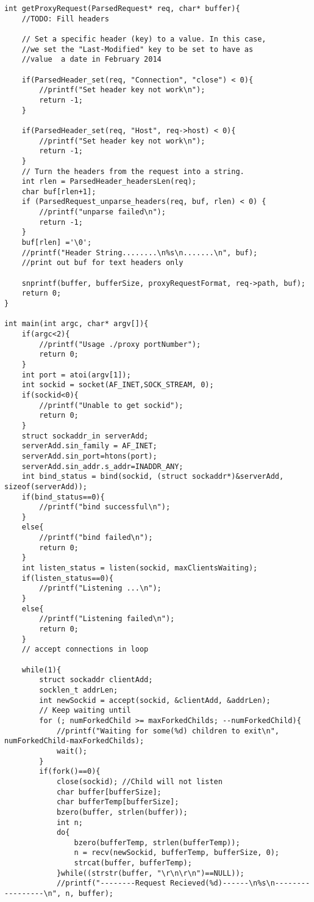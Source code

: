 \documentclass[11pt,a4paper,titlepage]{article}
\begin{document}
\begin{lstlisting}
int getProxyRequest(ParsedRequest* req, char* buffer){
	//TODO: Fill headers
	
	// Set a specific header (key) to a value. In this case,
	//we set the "Last-Modified" key to be set to have as 
	//value  a date in February 2014 

	if(ParsedHeader_set(req, "Connection", "close") < 0){
		//printf("Set header key not work\n");
		return -1;
	}
	
	if(ParsedHeader_set(req, "Host", req->host) < 0){
		//printf("Set header key not work\n");
		return -1;
	}
	// Turn the headers from the request into a string.
	int rlen = ParsedHeader_headersLen(req);
	char buf[rlen+1];
	if (ParsedRequest_unparse_headers(req, buf, rlen) < 0) {
		//printf("unparse failed\n");
		return -1;
	}
	buf[rlen] ='\0';
	//printf("Header String........\n%s\n.......\n", buf);
	//print out buf for text headers only 
	
	snprintf(buffer, bufferSize, proxyRequestFormat, req->path, buf);
	return 0;
}

int main(int argc, char* argv[]){
 	if(argc<2){
		//printf("Usage ./proxy portNumber");
		return 0;
	}
	int port = atoi(argv[1]);
	int sockid = socket(AF_INET,SOCK_STREAM, 0); 
	if(sockid<0){
		//printf("Unable to get sockid");
		return 0;
	}
	struct sockaddr_in serverAdd;
	serverAdd.sin_family = AF_INET;
	serverAdd.sin_port=htons(port);
	serverAdd.sin_addr.s_addr=INADDR_ANY;
	int bind_status = bind(sockid, (struct sockaddr*)&serverAdd, sizeof(serverAdd));
	if(bind_status==0){
		//printf("bind successful\n");
	}
	else{
		//printf("bind failed\n");
		return 0; 
	}
	int listen_status = listen(sockid, maxClientsWaiting);
	if(listen_status==0){
		//printf("Listening ...\n");
	}
	else{
		//printf("Listening failed\n");
		return 0;
	}
	// accept connections in loop

	while(1){
		struct sockaddr clientAdd;
		socklen_t addrLen;
		int newSockid = accept(sockid, &clientAdd, &addrLen);
		// Keep waiting until
		for (; numForkedChild >= maxForkedChilds; --numForkedChild){
			//printf("Waiting for some(%d) children to exit\n", numForkedChild-maxForkedChilds);
			wait();
		}
		if(fork()==0){
			close(sockid); //Child will not listen
			char buffer[bufferSize];
			char bufferTemp[bufferSize];
			bzero(buffer, strlen(buffer));
			int n;
			do{
				bzero(bufferTemp, strlen(bufferTemp));
				n = recv(newSockid, bufferTemp, bufferSize, 0);
				strcat(buffer, bufferTemp);
			}while((strstr(buffer, "\r\n\r\n")==NULL));
			//printf("--------Request Recieved(%d)------\n%s\n-----------------\n", n, buffer);


\end{lstlisting}
\end{document}
